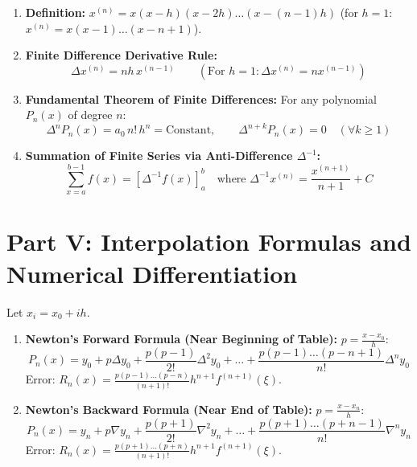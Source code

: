 \begin{theorembox}
\begin{enumerate}[label=\textbf{\arabic*.},noitemsep]
    \item \textbf{Definition:} $x^{(n)} = x(x-h)(x-2h)\dots(x-(n-1)h)$ (for $h = 1$: $x^{(n)} = x(x-1)\dots(x-n+1)$).
    \item \textbf{Finite Difference Derivative Rule:}
    \begin{equation}
        \boxed{\Delta x^{(n)} = n h \, x^{(n-1)}} \qquad (\text{For } h = 1: \Delta x^{(n)} = n x^{(n-1)})
    \end{equation}
    \item \textbf{Fundamental Theorem of Finite Differences:} For any polynomial $P_n(x)$ of degree $n$:
    \begin{equation}
        \boxed{\Delta^n P_n(x) = a_0 \, n! \, h^n = \text{Constant}}, \qquad \boxed{\Delta^{n+k} P_n(x) = 0 \quad (\forall k \ge 1)}
    \end{equation}
    \item \textbf{Summation of Finite Series via Anti-Difference $\Delta^{-1}$:}
    \begin{equation}
        \boxed{\sum_{x=a}^{b-1} f(x) = \left[ \Delta^{-1} f(x) \right]_{a}^{b}} \quad \text{where } \Delta^{-1} x^{(n)} = \frac{x^{(n+1)}}{n+1} + C
    \end{equation}
\end{enumerate}
\end{theorembox}

\section{Part V: Interpolation Formulas and Numerical Differentiation}

\begin{theorembox}
Let $x_i = x_0 + i h$.
\begin{enumerate}[label=\textbf{\arabic*.},noitemsep]
    \item \textbf{Newton's Forward Formula (Near Beginning of Table):} $p = \frac{x - x_0}{h}$:
    \begin{equation}
        \boxed{P_n(x) = y_0 + p \Delta y_0 + \frac{p(p-1)}{2!} \Delta^2 y_0 + \dots + \frac{p(p-1)\dots(p-n+1)}{n!} \Delta^n y_0}
    \end{equation}
    Error: $R_n(x) = \frac{p(p-1)\dots(p-n)}{(n+1)!} h^{n+1} f^{(n+1)}(\xi)$.
    \item \textbf{Newton's Backward Formula (Near End of Table):} $p = \frac{x - x_n}{h}$:
    \begin{equation}
        \boxed{P_n(x) = y_n + p \nabla y_n + \frac{p(p+1)}{2!} \nabla^2 y_n + \dots + \frac{p(p+1)\dots(p+n-1)}{n!} \nabla^n y_n}
    \end{equation}
    Error: $R_n(x) = \frac{p(p+1)\dots(p+n)}{(n+1)!} h^{n+1} f^{(n+1)}(\xi)$.
\end{enumerate}
\end{theorembox}

